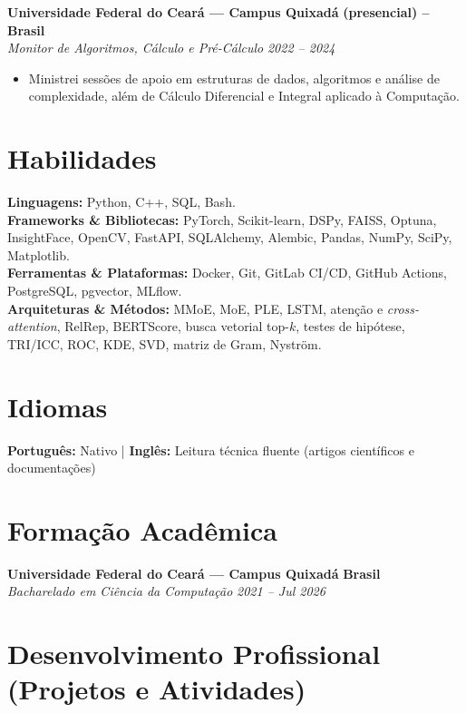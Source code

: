 \documentclass[a4paper,10pt]{article}
\newcommand{\entrada}[4]{%
    \noindent\textbf{#1} \hfill \textbf{#2}\\
    \textit{#3} \hfill \textit{#4}\par
}
\begin{document}
\vspace{4pt}

\entrada
    {Universidade Federal do Ceará --- Campus Quixadá}
    {(presencial) -- Brasil}
    {Monitor de Algoritmos, Cálculo e Pré-Cálculo}
    {2022 -- 2024}

\begin{itemize}
    \item Ministrei sessões de apoio em estruturas de dados, algoritmos e
    análise de complexidade, além de Cálculo Diferencial e Integral aplicado
    à Computação.
\end{itemize}

\section*{Habilidades}

\noindent
\textbf{Linguagens:} Python, C++, SQL, Bash.\\[2pt]
\textbf{Frameworks \& Bibliotecas:} PyTorch, Scikit-learn, DSPy, FAISS,
Optuna, InsightFace, OpenCV, FastAPI, SQLAlchemy, Alembic, Pandas, NumPy,
SciPy, Matplotlib.\\[2pt]
\textbf{Ferramentas \& Plataformas:} Docker, Git, GitLab CI/CD,
GitHub Actions, PostgreSQL, pgvector, MLflow.\\[2pt]
\textbf{Arquiteturas \& Métodos:} MMoE, MoE, PLE, LSTM, atenção e
\textit{cross-attention}, RelRep, BERTScore, busca vetorial top-$k$,
testes de hipótese, TRI/ICC, ROC, KDE, SVD, matriz de Gram, Nyström.

\section*{Idiomas}

\noindent
\textbf{Português:} Nativo \; | \;
\textbf{Inglês:} Leitura técnica fluente (artigos científicos e
documentações)

\section*{Formação Acadêmica}

\entrada
    {Universidade Federal do Ceará --- Campus Quixadá}
    {Brasil}
    {Bacharelado em Ciência da Computação}
    {2021 -- Jul 2026}

\section*{Desenvolvimento Profissional (Projetos e Atividades)}
\end{document}
